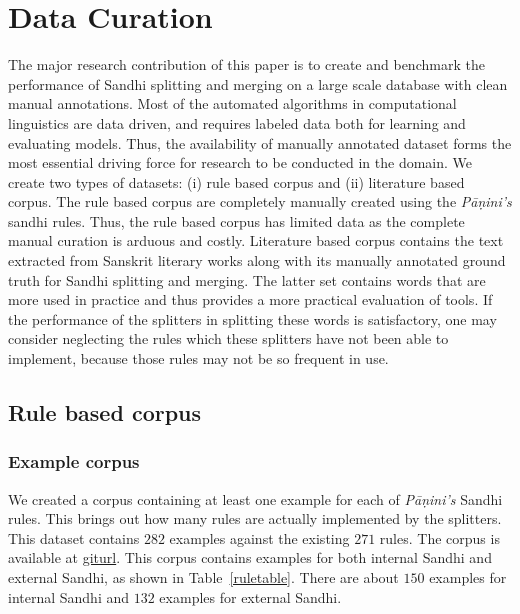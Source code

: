 \documentclass[11pt]{article}
\begin{document}
\section{Data Curation}
The major research contribution of this paper is to create and benchmark the performance of Sandhi splitting and merging on a large scale database with clean manual annotations. Most of the automated algorithms in computational linguistics are data driven, and requires labeled data both for learning and evaluating models. Thus, the availability of manually annotated dataset forms the most essential driving force for research to be conducted in the domain. We create two types of datasets: (i) rule based corpus and (ii) literature based corpus. The rule based corpus are completely manually created using the \textit{P\={a}\d{n}ini's} sandhi rules. Thus, the rule based corpus has limited data as the complete manual curation is arduous and costly. 
Literature based corpus contains the text extracted from Sanskrit literary works along with its manually annotated ground truth for Sandhi splitting and merging. The latter set contains words that are more used in practice and thus provides a more practical evaluation of tools. If the performance of the splitters in splitting these words is satisfactory, one may consider neglecting the rules which these splitters have not been able to implement, because those rules may not be so frequent in use.

\subsection{Rule based corpus}
\subsubsection{Example corpus}
We created a corpus containing at least one example for each of \textit{P\={a}\d{n}ini's} Sandhi rules. This brings out how many rules are actually implemented by the splitters. This dataset contains $282$ examples against the existing $271$ rules. The corpus is available at \url{giturl}. This corpus contains examples for both internal Sandhi and external Sandhi, as shown in Table~\ref{ruletable}. There are about $150$ examples for internal Sandhi and $132$ examples for external Sandhi.
\end{document}
